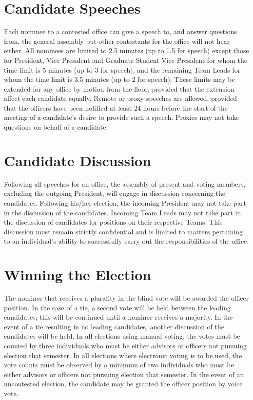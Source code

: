 \section{Candidate Speeches} Each nominee to a contested office can give a speech to, and answer questions from, the general assembly but other contestants for the office will not hear either. All nominees are limited to 2.5 minutes (up to 1.5 for speech) except those for President,  Vice President and Graduate Student Vice President for whom the time limit is 5 minutes (up to 3 for speech), and the remaining Team Leads for whom the time limit is 3.5 minutes (up to 2 for speech). These limits may be extended for any office by motion from the floor, provided that the extension affect each candidate equally. Remote or proxy speeches are allowed, provided that the officers have been notified at least 24 hours before the start of the meeting of a candidate's desire to provide such a speech. Proxies may not take questions on behalf of a candidate.
\section{Candidate Discussion} Following all speeches for an office, the assembly of present and voting members, excluding the outgoing President, will engage in discussion concerning the candidates.  Following his/her election, the incoming President may not take part in the discussion of the candidates. Incoming Team Leads may not take part in the discussion of candidates for positions on their respective Teams. This discussion must remain strictly confidential and is limited to matters pertaining to an individual's ability to successfully carry out the responsibilities of the office. 
\section{Winning the Election} The nominee that receives a plurality in the blind vote will be awarded the officer position.  In the case of a tie, a second vote will be held between the leading candidates; this will be continued until a nominee receives a majority.  In the event of a tie resulting in no leading candidates, another discussion of the candidates will be held. In all elections using manual voting, the votes must be counted by three individuals who must be either advisors or officers not pursuing election that semester. In all elections where electronic voting is to be used, the vote counts must be observed by a minimum of two individuals who must be either advisors or officers not pursuing election that semester.  In the event of an uncontested election, the candidate may be granted the officer position by voice vote. 

